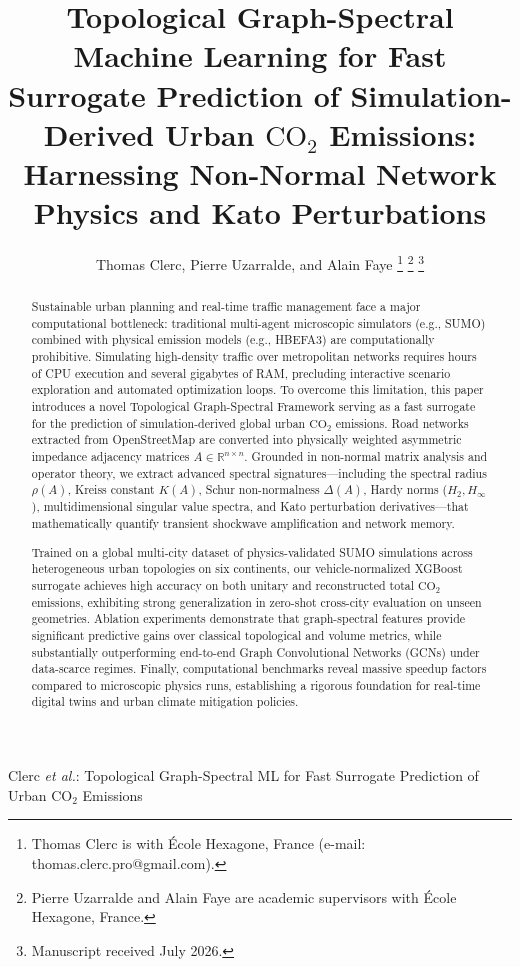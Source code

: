 \documentclass[lettersize,journal]{IEEEtran}
\begin{document}
\title{Topological Graph-Spectral Machine Learning for Fast Surrogate Prediction of Simulation-Derived Urban $\text{CO}_2$ Emissions: Harnessing Non-Normal Network Physics and Kato Perturbations}

\author{Thomas Clerc, Pierre Uzarralde, and Alain Faye
\thanks{Thomas Clerc is with École Hexagone, France (e-mail: thomas.clerc.pro@gmail.com).}%
\thanks{Pierre Uzarralde and Alain Faye are academic supervisors with École Hexagone, France.}%
\thanks{Manuscript received July 2026.}}

%
{Clerc \MakeLowercase{\textit{et al.}}: Topological Graph-Spectral ML for Fast Surrogate Prediction of Urban $\text{CO}_2$ Emissions}

\maketitle

\begin{abstract}
Sustainable urban planning and real-time traffic management face a major computational bottleneck: traditional multi-agent microscopic simulators (e.g., SUMO) combined with physical emission models (e.g., HBEFA3) are computationally prohibitive. Simulating high-density traffic over metropolitan networks requires hours of CPU execution and several gigabytes of RAM, precluding interactive scenario exploration and automated optimization loops. To overcome this limitation, this paper introduces a novel Topological Graph-Spectral Framework serving as a fast surrogate for the prediction of simulation-derived global urban $\text{CO}_2$ emissions. Road networks extracted from OpenStreetMap are converted into physically weighted asymmetric impedance adjacency matrices $A \in \mathbb{R}^{n \times n}$. Grounded in non-normal matrix analysis and operator theory, we extract advanced spectral signatures—including the spectral radius $\rho(A)$, Kreiss constant $K(A)$, Schur non-normalness $\Delta(A)$, Hardy norms ($H_2, H_\infty$), multidimensional singular value spectra, and Kato perturbation derivatives—that mathematically quantify transient shockwave amplification and network memory. 

Trained on a global multi-city dataset of physics-validated SUMO simulations across heterogeneous urban topologies on six continents, our vehicle-normalized XGBoost surrogate achieves high accuracy on both unitary and reconstructed total $\text{CO}_2$ emissions, exhibiting strong generalization in zero-shot cross-city evaluation on unseen geometries. Ablation experiments demonstrate that graph-spectral features provide significant predictive gains over classical topological and volume metrics, while substantially outperforming end-to-end Graph Convolutional Networks (GCNs) under data-scarce regimes. Finally, computational benchmarks reveal massive speedup factors compared to microscopic physics runs, establishing a rigorous foundation for real-time digital twins and urban climate mitigation policies.
\end{abstract}
\end{document}
